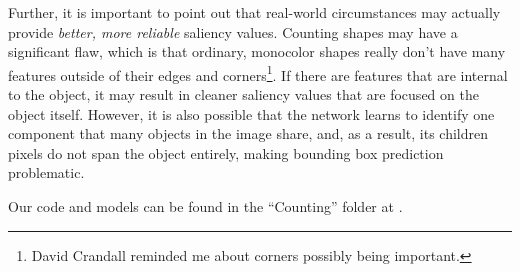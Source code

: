 Further, it is important to point out that real-world circumstances may actually provide
\textit{better, more reliable} saliency values. Counting shapes may have a significant flaw, which
is that ordinary, monocolor shapes really don't have many features outside of their edges and
corners\footnote{David Crandall reminded me about corners possibly being important.}. If there are
features that are internal to the object, it may result in cleaner saliency values that are focused
on the object itself. However, it is also possible that the network learns to identify one component
that many objects in the image share, and, as a result, its children pixels do not span the object
entirely, making bounding box prediction problematic.

Our code and models can be found in the ``Counting'' folder at \cite{mycode}.
